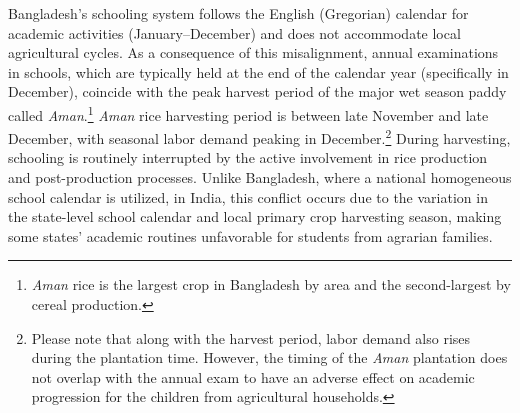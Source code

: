 \documentclass[12pt,letterpaper]{article}
\newcommand{\0}{\ensuremath{\mbox{\boldmath $0$}}}
\begin{document}
Bangladesh’s schooling system follows the English (Gregorian) calendar for academic activities (January–December) and does not accommodate local agricultural cycles. As a consequence of this misalignment, annual examinations in schools, which are typically held at the end of the calendar year (specifically in December), coincide with the peak harvest period of the major wet season paddy called \textit{Aman}.\footnote{\textit{Aman} rice is the largest crop in Bangladesh by area and the second-largest by cereal production.} \textit{Aman} rice harvesting period is between late November and late December, with seasonal labor demand peaking in December.\footnote{Please note that along with the harvest period, labor demand also rises during the plantation time. However, the timing of the \textit{Aman} plantation does not overlap with the annual exam to have an adverse effect on academic progression for the children from agricultural households.} During harvesting, schooling is routinely interrupted by the active involvement in rice production and post-production processes. Unlike Bangladesh, where a national homogeneous school calendar is utilized, in India, this conflict occurs due to the variation in the state-level school calendar and local primary crop harvesting season, making some states' academic routines unfavorable for students from agrarian families. 
\end{document}
